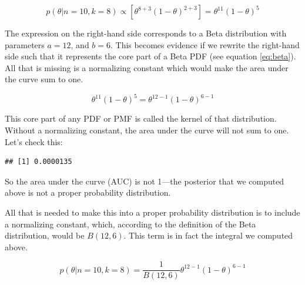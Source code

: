 \documentclass[12pt,]{krantz}
\newenvironment{Shaded}{\begin{snugshade}}{\end{snugshade}}
\newcommand{\ControlFlowTok}[1]{\textcolor[rgb]{0.13,0.29,0.53}{\textbf{#1}}}
\newcommand{\DataTypeTok}[1]{\textcolor[rgb]{0.13,0.29,0.53}{#1}}
\newcommand{\DecValTok}[1]{\textcolor[rgb]{0.00,0.00,0.81}{#1}}
\newcommand{\KeywordTok}[1]{\textcolor[rgb]{0.13,0.29,0.53}{\textbf{#1}}}
\newcommand{\NormalTok}[1]{#1}
\newcommand{\OperatorTok}[1]{\textcolor[rgb]{0.81,0.36,0.00}{\textbf{#1}}}
\newcommand{\StringTok}[1]{\textcolor[rgb]{0.31,0.60,0.02}{#1}}
\theoremstyle{definition}
\theoremstyle{definition}
\theoremstyle{definition}
\theoremstyle{remark}
\begin{document}
\begin{equation}
p(\theta|n=10,k=8) \propto   [\theta^{8+3} (1-\theta)^{2+3}] = \theta^{11} (1-\theta)^{5}
\label{eq:betaunpost4}
\end{equation}

The expression on the right-hand side corresponds to a Beta distribution with parameters \(a=12\), and \(b=6\). This becomes evidence if we rewrite the right-hand side such that it represents the core part of a Beta PDF (see equation \eqref{eq:beta}). All that is missing is a normalizing constant which would make the area under the curve sum to one.

\begin{equation}
\theta^{11} (1-\theta)^{5} = \theta^{12-1} (1-\theta)^{6-1} 
\end{equation}

This core part of any PDF or PMF is called the kernel of that distribution. Without a normalizing constant, the area under the curve will not sum to one. Let's check this:

\begin{Shaded}
\end{Shaded}

\begin{verbatim}
## [1] 0.0000135
\end{verbatim}

So the area under the curve (AUC) is not 1---the posterior that we computed above is not a proper probability distribution.

All that is needed to make this into a proper probability distribution is to include a normalizing constant, which, according to the definition of the Beta distribution, would be \(B(12,6)\). This term is in fact the integral we computed above.

\begin{equation}
p(\theta|n=10,k=8) = \frac{1}{B(12,6)} \theta^{12-1} (1-\theta)^{6-1} 
\end{equation}
\end{document}
